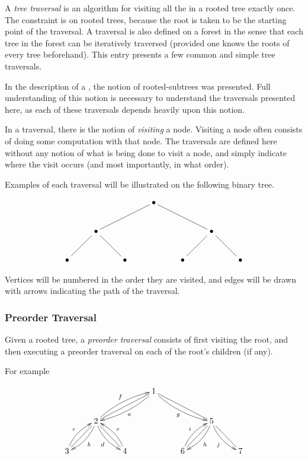 \documentclass[12pt]{article}
\begin{document}
A \emph{tree traversal} is an algorithm for visiting all the  in a rooted tree exactly once.  The constraint is on rooted trees, because the root is taken to be the starting point of the traversal.  A traversal is also defined on a forest in the sense that each tree in the forest can be iteratively traversed (provided one knows the roots of every tree beforehand).  This entry presents a few common and simple tree traversals.

In the description of a , the notion of rooted-subtrees
was presented.  Full understanding of this notion is necessary to understand the traversals presented here, as each of these traversals depends heavily upon this notion.

In a traversal, there is the notion of \emph{visiting} a node.  Visiting a node often consists of doing some computation with that node.  The traversals are defined here without any notion of what is being done to visit a node, and simply indicate where the visit occurs (and most importantly, in what order).

Examples of each traversal will be illustrated on the following binary tree.

\[
\xymatrix{
&&&\bullet \ar@{-}[dll] \ar@{-}[drr] \\
&\bullet \ar@{-}[dl] \ar@{-}[dr] &&&& \bullet \ar@{-}[dl] \ar@{-}[dr] \\
\bullet && \bullet && \bullet && \bullet
}
\]

Vertices will be numbered in the order they are visited, and edges will be drawn with arrows indicating the path of the traversal.


\subsubsection*{Preorder Traversal}

Given a rooted tree, a \emph{preorder traversal} consists of first visiting the root, and then executing a preorder traversal on each of the root's children (if any).

For example

\[
\xymatrix{
&&&1 \ar@/^/[dll]^a \ar@/_/[drr]_g \ar@{-}[dll] \ar@{-}[drr] \\
&2 \ar@/^/[dl]^b \ar@/_/[dr]_d \ar@/^/[urr]^f \ar@{-}[dl] \ar@{-}[dr]&&&& 5 \ar@/^/[dl]^h \ar@/_/[dr]_j \ar@{-}[dl] \ar@{-}[dr] \\
3 \ar@/^/[ur]^c && 4 \ar@/_/[ul]_e && 6 \ar@/^/[ur]^i && 7
}
\]
\end{document}
